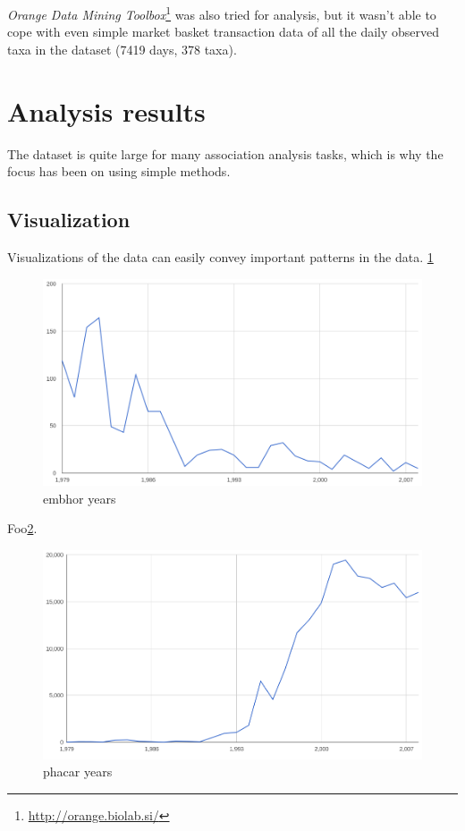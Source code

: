 \documentclass[english]{tktltiki2}
\begin{document}
\emph{Orange Data Mining Toolbox}\footnote{\url{http://orange.biolab.si/}} was also tried for analysis, but it wasn't able to cope with even simple market basket transaction data of all the daily observed taxa in the dataset (7419 days, 378 taxa).


\section{Analysis results}

The dataset is quite large for many association analysis tasks, which is why the focus has been on using simple methods.


\subsection{Visualization}

Visualizations of the data can easily convey important patterns in the data. \ref{fig: embhor_years}

\begin{figure}[htb]
\centering
\includegraphics[clip=true, width=\textwidth]{embhor_years}
\caption{embhor years}
\label{fig: embhor_years}
\end{figure}

Foo\ref{fig: phacar_years}.

\begin{figure}[htb]
\centering
\includegraphics[clip=true, width=\textwidth]{phacar_years}
\caption{phacar years}
\label{fig: phacar_years}
\end{figure}
\end{document}
